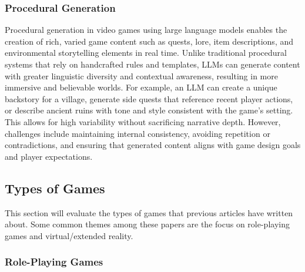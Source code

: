 \documentclass[10pt,twocolumn]{article}
\begin{document}
        \subsubsection{Procedural Generation}      

            \par
            Procedural generation in video games using large language models enables the creation of rich, varied game content such as quests, lore, item descriptions, and environmental storytelling elements in real time. Unlike traditional procedural systems that rely on handcrafted rules and templates, LLMs can generate content with greater linguistic diversity and contextual awareness, resulting in more immersive and believable worlds. For example, an LLM can create a unique backstory for a village, generate side quests that reference recent player actions, or describe ancient ruins with tone and style consistent with the game’s setting. This allows for high variability without sacrificing narrative depth. However, challenges include maintaining internal consistency, avoiding repetition or contradictions, and ensuring that generated content aligns with game design goals and player expectations.

    \subsection{Types of Games}

        \par
        This section will evaluate the types of games that previous articles have written about. Some common themes among these papers are the focus on role-playing games and virtual/extended reality. 

        \subsubsection{Role-Playing Games}
\end{document}
